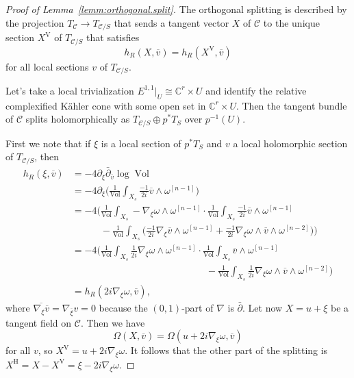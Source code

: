 \documentclass[11pt,a4paper]{amsart}
\theoremstyle{definition}
\theoremstyle{remark}
\newcommand{\CC}{\mathbb{C}}
\newcommand{\Vol}{\mathop{\mathrm{Vol}}}
\def\ov#1{\overline{#1}}
\def\dbar{\bar\partial}
\def\conn{\nabla}
\def\kf{\omega}
\def\kcForm{\Omega}
\def\kcHerm{h_R}
\def\ton{u}
\def\ttw{v}
\def\^#1{^{[#1]}}
\def\KC{C}
\def\RKC{\mathcal{\KC}}
\begin{document}
\begin{proof}[Proof of Lemma~\ref{lemm:orthogonal.split}]
The orthogonal splitting is described by the projection $T_{\RKC} \to
T_{\RKC/S}$ that sends a tangent vector $X$ of $\RKC$ to the unique
section $X^{\mathrm{V}}$ of $T_{\RKC/S}$ that satisfies
\begin{equation}
\label{eq:smooth.split}
\kcHerm(X, \ov{\ttw}) = \kcHerm(X^{\mathrm{V}}, \ov{\ttw})
\end{equation}
for all local sections $\ttw$ of $T_{\RKC/S}$.

Let's take a local trivialization $E^{1,1}|_U \cong \CC^r \times U$
and identify the relative complexified K\"{a}hler cone with some open
set in $\CC^r \times U$. Then the tangent bundle of $\RKC$ splits
holomorphically as $T_{\RKC/S} \oplus p^* T_S$ over $p^{-1}(U)$.

First we note that if $\xi$ is a local section of $p^*T_S$ and $v$ a
local holomorphic section of $T_{\RKC/S}$, then
\begin{align*}
\kcHerm(\xi, \ov{\ttw})
&=
-4\partial_{\xi} \dbar_{\ov{\ttw}} \log \Vol
\\
&=
-4\partial_{\xi}
\biggl(
\frac{1}{\Vol} 
\int_{X_s} \frac{-1}{2i} \ov{\ttw} \wedge \kf\^{n-1}
\biggr)
\\
&= 
-4
\biggl(
\frac{1}{\Vol} 
\int_{X_s} -\conn_{\xi} \kf \wedge \kf\^{n-1}
\cdot
\frac{1}{\Vol} 
\int_{X_s} \frac{-1}{2i} \ov{\ttw} \wedge \kf\^{n-1}
\\
&
\qquad
\quad
- \frac{1}{\Vol}
\int_{X_s} 
\biggl(
\frac{-1}{2i} \conn_{\xi}\ov{\ttw} \wedge \kf\^{n-1}
+
\frac{-1}{2i} \conn_{\xi}\kf \wedge \ov{\ttw} \wedge \kf\^{n-2}
\biggr)
\biggr)
\\
&= 
-4
\biggl(
\frac{1}{\Vol} 
\int_{X_s} \frac{1}{2i}\conn_{\xi} \kf \wedge \kf\^{n-1}
\cdot
\frac{1}{\Vol} 
\int_{X_s} \ov{\ttw} \wedge \kf\^{n-1}
\\
&
\qquad
\qquad
\qquad
\qquad
\qquad
\qquad
\qquad
-
\frac{1}{\Vol}
\int_{X_s} 
\frac{1}{2i}\conn_{\xi}\kf \wedge \ov{\ttw} \wedge \kf\^{n-2}
\biggr)
\\
&=
\kcHerm(2i\conn_{\xi}\kf, \ov{\ttw}),
\end{align*}
where $\ov{\conn_{\xi}\ov{\ttw}} = \conn_{\ov{\xi}}\ttw = 0$ because
the $(0,1)$-part of $\conn$ is $\dbar$.  Let now $X = \ton +
\xi$ be a tangent field on $\RKC$. Then we have 
$$
\kcForm(X, \ov{\ttw})
= \kcForm(\ton + 2i \conn_{\xi}\kf, \ov{\ttw})
$$
for all $v$, so $X^{\mathrm{V}} = \ton + 2i \conn_{\xi}\kf$. It
follows that the other part of the splitting is $X^{\mathrm{H}} = X
- X^{\mathrm{V}} = \xi - 2i \conn_{\xi}\kf$.
\end{proof}
\end{document}
